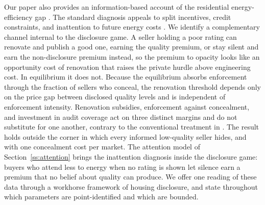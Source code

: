 Our paper also provides an information-based account of the residential energy-efficiency gap
\citep{allcott_is_2012, gerarden_assessing_2017}. The standard diagnosis appeals to split
incentives, credit constraints, and inattention to future energy costs \citep{allcott_consumers_2011, sallee_rational_2014, allcott_evaluating_2015}. We identify a
complementary channel internal to the disclosure game. A seller holding a poor rating can
renovate and publish a good one, earning the quality premium, or stay silent and earn the
non-disclosure premium instead, so the premium to opacity looks like an opportunity cost of
renovation that raises the private hurdle above engineering cost. In equilibrium it does not. Because the equilibrium absorbs enforcement through the fraction of sellers who
conceal, the renovation threshold depends only on the price gap between disclosed quality
levels and is independent of enforcement intensity. Renovation subsidies, enforcement against
concealment, and investment in audit coverage act on three distinct margins and do not substitute for one another,
contrary to the conventional treatment in
\citet{gillingham_palmer_2014}. The result holds outside the corner in which every informed low-quality seller hides, and with one concealment cost per market.
The attention model of Section~\ref{ss:attention} brings the inattention
diagnosis inside the disclosure game: buyers who attend less to energy when no rating is shown let
silence earn a premium that no belief about quality can produce. We offer one reading of these data through a workhorse framework of housing
disclosure, and state throughout which parameters are point-identified and which are bounded.

